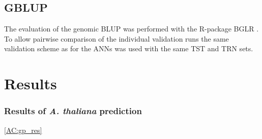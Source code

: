 \subsection{GBLUP}

The evaluation of the genomic BLUP was performed with the R-package BGLR \cite{BGLR}. To allow pairwise
comparison of the individual validation runs the same validation scheme as for the ANNs was used with the same
TST and TRN sets. 



\singlespacing
\section{Results} \label{res:gp}
\subsubsection{Results of \textit{A. thaliana} prediction}
\ref{AC:gp_res}
